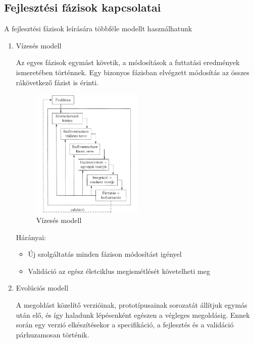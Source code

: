 \documentclass[margin=0px]{article}
\begin{document}
\subsection{Fejlesztési fázisok kapcsolatai}

A fejlesztési fázisok leírására többféle modellt használhatunk
\begin{enumerate}
    \item Vízesés modell

          Az egyes fázisok egymást követik, a
          módosítások a futtatási eredmények ismeretében történnek. Egy bizonyos
          fázisban elvégzett módosítás az összes rákövetkező fázist is érinti.

          \begin{figure}[H]
              \centering
              \includegraphics[width=0.5\textwidth]{img/vizeses.png}
              \caption{Vízesés modell}
              \label{fig:vizeses}
          \end{figure}

          Hárányai:
          \begin{itemize}
              \item Új szolgáltatás minden fázison módosítást igényel
              \item Validáció az egész életciklus megismétlését követelheti meg
          \end{itemize}
    \item Evolúciós modell

          A megoldást közelítő verzióinak, prototípusainak sorozatát
          állítjuk egymás után elő, és így haladunk lépésenként egészen a végleges
          megoldásig. Ennek során egy verzió elkészítésekor a specifikáció, a fejlesztés és a validáció párhuzamosan történik.


\end{enumerate}
\end{document}
